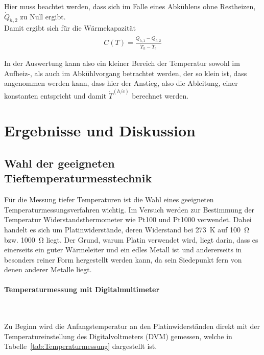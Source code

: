 \documentclass[parskip=half, a4paper,twoside,final]{article}
\begin{document}
Hier muss beachtet werden, dass sich im Falle eines Abkühlens ohne Restheizen, $\dot{Q}_{h,2}$ zu Null ergibt.\\
Damit ergibt sich für die Wärmekapazität
\begin{align}\label{equ:DS}
  C(T) = \frac{\dot{Q}_{h,1}-\dot{Q}_{h,2}}{\dot{T}_h - \dot{T}_c}
\end{align}

In der Auswertung kann also ein kleiner Bereich der Temperatur sowohl im Aufheiz-, als auch im Abkühlvorgang betrachtet werden, der so klein ist, dass angenommen werden kann, dass hier der Anstieg, also die Ableitung, einer konstanten entspricht und damit $\dot{T}^(h/c)$ berechnet werden.

\newpage
\section{Ergebnisse und Diskussion}\label{sec:ErgebnisseUndDiskussion}

\subsection{Wahl der geeigneten Tieftemperaturmesstechnik}
Für die Messung tiefer Temperaturen ist die Wahl eines geeigneten Temperaturmessungsverfahren wichtig. Im Versuch werden zur Bestimmung der Temperatur Widerstandsthermometer wie Pt100 und Pt1000 verwendet. Dabei handelt es sich um Platinwiderstände, deren Widerstand bei \SI{273}{\kelvin} auf \SI{100}{\ohm} bzw. \SI{1000}{\ohm} liegt. Der Grund, warum Platin verwendet wird, liegt darin, dass es einerseits ein guter Wärmeleiter und ein edles Metall ist und andererseits in besonders reiner Form hergestellt werden kann, da sein Siedepunkt fern von denen anderer Metalle liegt.

\paragraph{Temperaturmessung mit Digitalmultimeter}$~$

Zu Beginn wird die Anfangstemperatur an den Platinwiderständen direkt mit der Temperatureinstellung des Digitalvoltmeters (DVM) gemessen, welche in Tabelle~\ref{tab:Temperaturmessung} dargestellt ist.
\end{document}

